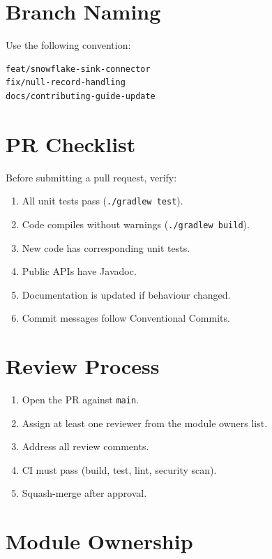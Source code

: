 \documentclass[
    language=english,
    doctype=manual,
    institution=none,
    titlestyle=book,
    oneside,
]{../../omnilatex}
\begin{document}
\section{Branch Naming}

Use the following convention:

\begin{lstlisting}[language=bash, caption={Branch naming conventions.}]
feat/snowflake-sink-connector
fix/null-record-handling
docs/contributing-guide-update
\end{lstlisting}

\section{PR Checklist}

Before submitting a pull request, verify:

\begin{enumerate}
    \item All unit tests pass (\texttt{./gradlew test}).
    \item Code compiles without warnings (\texttt{./gradlew build}).
    \item New code has corresponding unit tests.
    \item Public APIs have Javadoc.
    \item Documentation is updated if behaviour changed.
    \item Commit messages follow Conventional Commits.
\end{enumerate}

\section{Review Process}

\begin{enumerate}
    \item Open the PR against \texttt{main}.
    \item Assign at least one reviewer from the module owners list.
    \item Address all review comments.
    \item CI must pass (build, test, lint, security scan).
    \item Squash-merge after approval.
\end{enumerate}

\section{Module Ownership}
\end{document}
